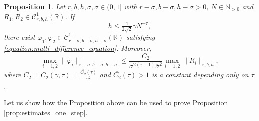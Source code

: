 \documentclass[10pt]{article}
\newtheorem{proposition}[theorem]{Proposition}
\newcommand{\N}{\mathbb{N}}
\newcommand{\R}{\mathbb{R}}
\newcommand{\C}{\mathbb{C}}
\newcommand{\T}{\mathbb{T}}
\begin{document}
\begin{proposition}
\label{proposition:solution_truncated_difference_equation}
Let $r,b,h,\sigma,\overline\sigma \in(0,1]$ with $r-\sigma,b-\overline\sigma,h-\overline\sigma>0$, $N \in \N_{> 0}$ and $\overline R_1, \overline R_2\in\mathscr C^1_{r,b,h}(\R)$. 
If 
\[
h \leq \tfrac{1}{2\sqrt 2}\gamma N^{-\tau},
\]
there exist $\overline \varphi_1, \overline \varphi_2\in\mathscr C^{1+}_{r-\sigma,b-\overline\sigma,h-\overline\sigma}(\R)$ satisfying \eqref{equation:multi_difference_equation}. Moreover,
 \begin{equation}
 \label{equation:norm_control_difference_equation}
  \max_{i=1,2}
 \|\overline \varphi_i\|^+_{r - \sigma, b - \overline \sigma, h - \overline \sigma} 
 \leq 
 \frac{C_2}{\sigma^{2(\tau+1)}\overline\sigma^2}
 \max_{i=1,2} 
 \|\overline R_i\|_{r, b, h},
 \end{equation}
where $C_2 = C_2(\gamma, \tau) = \tfrac{\overline{C_2}(\tau)}{\gamma^2}$ and $\overline{C_2}(\tau) > 1$ is a constant depending only on $\tau$.
\end{proposition}

Let us show how the Proposition above can be used to prove Proposition \ref{prop:estimates_one_step}.
\end{document}
